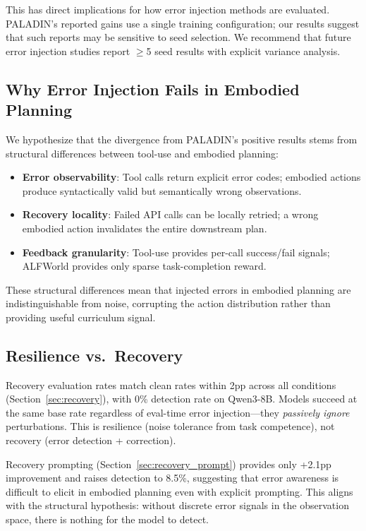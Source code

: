\documentclass[11pt,a4paper]{article}
\begin{document}
This has direct implications for how error injection methods are evaluated.
PALADIN's reported gains use a single training configuration; our results suggest that such reports may be sensitive to seed selection.
We recommend that future error injection studies report $\geq$5 seed results with explicit variance analysis.

\subsection{Why Error Injection Fails in Embodied Planning}

We hypothesize that the divergence from PALADIN's positive results stems from structural differences between tool-use and embodied planning:

\begin{itemize}
\item \textbf{Error observability}: Tool calls return explicit error codes; embodied actions produce syntactically valid but semantically wrong observations.
\item \textbf{Recovery locality}: Failed API calls can be locally retried; a wrong embodied action invalidates the entire downstream plan.
\item \textbf{Feedback granularity}: Tool-use provides per-call success/fail signals; ALFWorld provides only sparse task-completion reward.
\end{itemize}

These structural differences mean that injected errors in embodied planning are indistinguishable from noise, corrupting the action distribution rather than providing useful curriculum signal.

\subsection{Resilience vs.\ Recovery}

Recovery evaluation rates match clean rates within 2pp across all conditions (Section~\ref{sec:recovery}), with 0\% detection rate on Qwen3-8B.
Models succeed at the same base rate regardless of eval-time error injection---they \emph{passively ignore} perturbations.
This is resilience (noise tolerance from task competence), not recovery (error detection + correction).

Recovery prompting (Section~\ref{sec:recovery_prompt}) provides only +2.1pp improvement and raises detection to 8.5\%, suggesting that error awareness is difficult to elicit in embodied planning even with explicit prompting.
This aligns with the structural hypothesis: without discrete error signals in the observation space, there is nothing for the model to detect.
\end{document}
